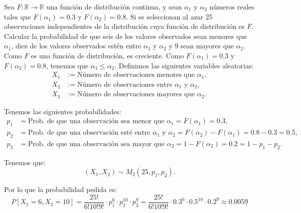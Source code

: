 \begin{ejercicio}
    Sea $F : \mathbb{R} \to \mathbb{R}$ una función de distribución continua, y sean $\alpha_1$ y $\alpha_2$ números reales tales que $F(\alpha_1) = 0.3$ y $F(\alpha_2) = 0.8$. Si se seleccionan al azar 25 observaciones independientes de la distribución cuya función de distribución es $F$. Calcular la probabilidad de que seis de los valores
    observados sean menores que $\alpha_1$, diez de los valores observados estén entre $\alpha_1$ y $\alpha_2$ y 9 sean mayores que $\alpha_2$.\\

    Como $F$ es una función de distribución, es creciente. Como $F(\alpha_1) = 0.3$ y $F(\alpha_2) = 0.8$, tenemos que $\alpha_1\leq \alpha_2$. Definimos las siguientes variables aleatorias:
    \begin{align*}
        X_1 &:= \text{Número de observaciones menores que }\alpha_1,\\
        X_2 &:= \text{Número de observaciones entre }\alpha_1\text{ y }\alpha_2,\\
        X_3 &:= \text{Número de observaciones mayores que }\alpha_2.
    \end{align*}
    
    Tenemos las siguientes probabilidades:
    \begin{align*}
        p_1 &= \text{Prob. de que una observación sea menor que }\alpha_1 = F(\alpha_1) = 0.3,\\
        p_2 &= \text{Prob. de que una observación esté entre }\alpha_1\text{ y }\alpha_2 = F(\alpha_2) - F(\alpha_1) = 0.8 - 0.3 = 0.5,\\
        p_3 &= \text{Prob. de que una observación sea mayor que }\alpha_2 = 1 - F(\alpha_2) = 0.2 = 1 - p_1 - p_2.
    \end{align*}

    Tenemos que:
    \begin{equation*}
        (X_1,X_2) \sim M_2\left(25,p_1,p_2\right).
    \end{equation*}

    Por lo que la probabilidad pedida es:
    \begin{equation*}
        P[X_1 = 6,X_2 = 10] = \dfrac{25!}{6!10!9!}\cdot p_1^6 \cdot p_2^{10} \cdot p_3^9
        = \dfrac{25!}{6!10!9!} \cdot 0.3^6 \cdot 0.5^{10} \cdot 0.2^9
        \approx 0.0059
    \end{equation*}
\end{ejercicio}

